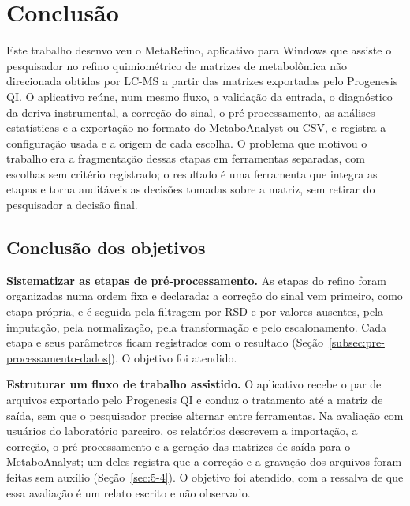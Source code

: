 
\chapter[Conclusão]{Conclusão}

Este trabalho desenvolveu o MetaRefino, aplicativo para Windows que assiste o pesquisador no refino quimiométrico de matrizes de metabolômica não direcionada obtidas por LC-MS a partir das matrizes exportadas pelo Progenesis QI. O aplicativo reúne, num mesmo fluxo, a validação da entrada, o diagnóstico da deriva instrumental, a correção do sinal, o pré-processamento, as análises estatísticas e a exportação no formato do MetaboAnalyst ou CSV, e registra a configuração usada e a origem de cada escolha. O problema que motivou o trabalho era a fragmentação dessas etapas em ferramentas separadas, com escolhas sem critério registrado; o resultado é uma ferramenta que integra as etapas e torna auditáveis as decisões tomadas sobre a matriz, sem retirar do pesquisador a decisão final.

\section{Conclusão dos objetivos}

\textbf{Sistematizar as etapas de pré-processamento.} As etapas do refino foram organizadas numa ordem fixa e declarada: a correção do sinal vem primeiro, como etapa própria, e é seguida pela filtragem por RSD e por valores ausentes, pela imputação, pela normalização, pela transformação e pelo escalonamento. Cada etapa e seus parâmetros ficam registrados com o resultado (Seção~\ref{subsec:pre-processamento-dados}). O objetivo foi atendido.

\textbf{Estruturar um fluxo de trabalho assistido.} O aplicativo recebe o par de arquivos exportado pelo Progenesis QI e conduz o tratamento até a matriz de saída, sem que o pesquisador precise alternar entre ferramentas. Na avaliação com usuários do laboratório parceiro, os relatórios descrevem a importação, a correção, o pré-processamento e a geração das matrizes de saída para o MetaboAnalyst; um deles registra que a correção e a gravação dos arquivos foram feitas sem auxílio (Seção~\ref{sec:5-4}). O objetivo foi atendido, com a ressalva de que essa avaliação é um relato escrito e não observado.

